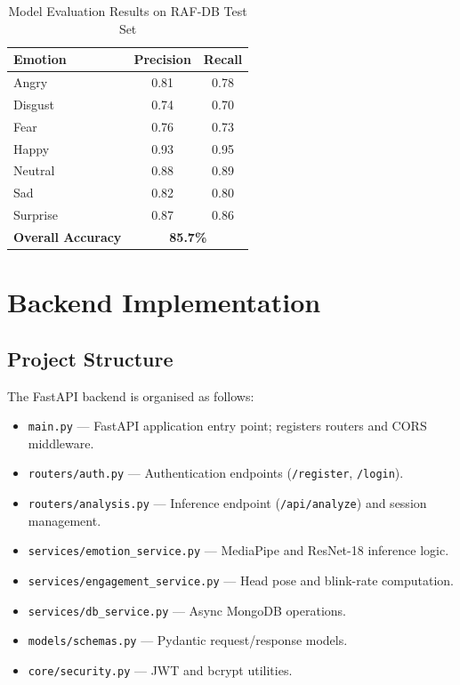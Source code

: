 \begin{table}[H]
\centering
\caption{Model Evaluation Results on RAF-DB Test Set}
\begin{tabular}{lcc}
\toprule
\textbf{Emotion}  & \textbf{Precision} & \textbf{Recall} \\
\midrule
Angry             & 0.81               & 0.78 \\
Disgust           & 0.74               & 0.70 \\
Fear              & 0.76               & 0.73 \\
Happy             & 0.93               & 0.95 \\
Neutral           & 0.88               & 0.89 \\
Sad               & 0.82               & 0.80 \\
Surprise          & 0.87               & 0.86 \\
\midrule
\textbf{Overall Accuracy} & \multicolumn{2}{c}{\textbf{85.7\%}} \\
\bottomrule
\end{tabular}
\end{table}

\section{Backend Implementation}

\subsection{Project Structure}

The FastAPI backend is organised as follows:

\begin{itemize}
    \item \texttt{main.py} — FastAPI application entry point; registers
          routers and CORS middleware.
    \item \texttt{routers/auth.py} — Authentication endpoints
          (\texttt{/register}, \texttt{/login}).
    \item \texttt{routers/analysis.py} — Inference endpoint
          (\texttt{/api/analyze}) and session management.
    \item \texttt{services/emotion\_service.py} — MediaPipe and
          ResNet-18 inference logic.
    \item \texttt{services/engagement\_service.py} — Head pose and
          blink-rate computation.
    \item \texttt{services/db\_service.py} — Async MongoDB operations.
    \item \texttt{models/schemas.py} — Pydantic request/response models.
    \item \texttt{core/security.py} — JWT and bcrypt utilities.
\end{itemize}

